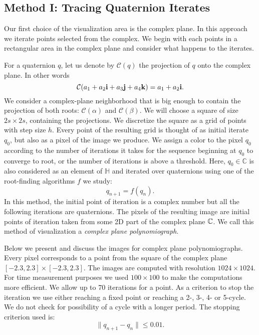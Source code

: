 \documentclass{article}
\theoremstyle{definition}
\def\Cal{\mathcal}
\begin{document}
\subsection{Method I:  Tracing Quaternion Iterates}
\label{CPVisualization}

Our first choice of the visualization area is the complex plane.  In this approach we iterate points selected from the complex.  We begin with each points in a rectangular area in the complex plane and consider what happens to the iterates.

For a quaternion $q$, let us denote by ${\Cal C}(q)$ the projection of $q$ onto the complex plane. In other words
\begin{equation}
{\Cal C}(a_1+a_2 {\bf i} + a_3 {\bf j}+ a_4 {\bf k})= a_1+a_2 {\bf i}.
\end{equation}
We consider a complex-plane neighborhood that is big enough to contain the projection of both roots: ${\Cal C}(\alpha)$ and ${\Cal C}(\beta)$. We will choose a square of size $2s\times 2s$, containing the projections. We discretize the square as a grid of points with step size $h$. Every point of the resulting grid is thought of as initial iterate $q_0$, but also as a pixel of the image we produce. We assign a color to the pixel $q_0$ according to the number of iterations it takes for the sequence beginning at $q_0$ to converge to root, or the number of iterations is above a threshold. Here, $q_0\in \mathbb C$ is also considered as an element of $\mathbb H$ and iterated over quaternions using one of the root-finding algorithms $f$ we study:
\begin{equation}
q_{n+1}=f(q_n).\label{ComplexPlane}
\end{equation}
In this method, the initial point of iteration is a complex number but all the following iterations are quaternions. The pixels of the resulting image are initial points of iteration taken from some 2D part of the complex plane ${\mathbb C}$. We call this method of visualization a {\it complex plane polynomiograph}.

Below we present and discuss the images for complex plane polynomiographs. Every pixel corresponds to a point from the square of the complex plane $[-2.3, 2.3] \times [-2.3,2.3]$.  The images are computed with resolution $1024\times 1024$.   For time measurement purposes we used $100 \times 100$ to make the computations more efficient.  We allow up to 70 iterations for a point. As a criterion to stop the iteration we use either reaching a fixed point or reaching a 2-, 3-, 4- or 5-cycle. We do not check for possibility of a cycle with a longer period.  The stopping criterion used is:
\begin{equation}
\| q_{n+1}-q_n\| \leq 0.01.
\end{equation}
\end{document}
